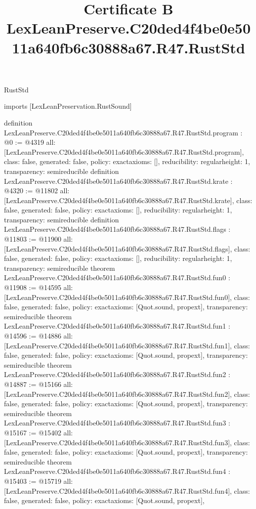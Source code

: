 \begin{lexlean}{RustStd}
\title{Certificate B LexLeanPreserve.C20ded4f4be0e5011a640fb6c30888a67.R47.RustStd}
\begin{coremodule}
imports [LexLeanPreservation.RustSound]

definition LexLeanPreserve.C20ded4f4be0e5011a640fb6c30888a67.R47.RustStd.program : @0 := @4319 {
  all: [LexLeanPreserve.C20ded4f4be0e5011a640fb6c30888a67.R47.RustStd.program],
  class: false,
  generated: false,
  policy: exact{axioms: []},
  reducibility: regular{height: 1},
  transparency: semireducible
}
definition LexLeanPreserve.C20ded4f4be0e5011a640fb6c30888a67.R47.RustStd.krate : @4320 := @11802 {
  all: [LexLeanPreserve.C20ded4f4be0e5011a640fb6c30888a67.R47.RustStd.krate],
  class: false,
  generated: false,
  policy: exact{axioms: []},
  reducibility: regular{height: 1},
  transparency: semireducible
}
definition LexLeanPreserve.C20ded4f4be0e5011a640fb6c30888a67.R47.RustStd.flags : @11803 := @11900 {
  all: [LexLeanPreserve.C20ded4f4be0e5011a640fb6c30888a67.R47.RustStd.flags],
  class: false,
  generated: false,
  policy: exact{axioms: []},
  reducibility: regular{height: 1},
  transparency: semireducible
}
theorem LexLeanPreserve.C20ded4f4be0e5011a640fb6c30888a67.R47.RustStd.fun0 : @11908 := @14595 {
  all: [LexLeanPreserve.C20ded4f4be0e5011a640fb6c30888a67.R47.RustStd.fun0],
  class: false,
  generated: false,
  policy: exact{axioms: [Quot.sound, propext]},
  transparency: semireducible
}
theorem LexLeanPreserve.C20ded4f4be0e5011a640fb6c30888a67.R47.RustStd.fun1 : @14596 := @14886 {
  all: [LexLeanPreserve.C20ded4f4be0e5011a640fb6c30888a67.R47.RustStd.fun1],
  class: false,
  generated: false,
  policy: exact{axioms: [Quot.sound, propext]},
  transparency: semireducible
}
theorem LexLeanPreserve.C20ded4f4be0e5011a640fb6c30888a67.R47.RustStd.fun2 : @14887 := @15166 {
  all: [LexLeanPreserve.C20ded4f4be0e5011a640fb6c30888a67.R47.RustStd.fun2],
  class: false,
  generated: false,
  policy: exact{axioms: [Quot.sound, propext]},
  transparency: semireducible
}
theorem LexLeanPreserve.C20ded4f4be0e5011a640fb6c30888a67.R47.RustStd.fun3 : @15167 := @15402 {
  all: [LexLeanPreserve.C20ded4f4be0e5011a640fb6c30888a67.R47.RustStd.fun3],
  class: false,
  generated: false,
  policy: exact{axioms: [Quot.sound, propext]},
  transparency: semireducible
}
theorem LexLeanPreserve.C20ded4f4be0e5011a640fb6c30888a67.R47.RustStd.fun4 : @15403 := @15719 {
  all: [LexLeanPreserve.C20ded4f4be0e5011a640fb6c30888a67.R47.RustStd.fun4],
  class: false,
  generated: false,
  policy: exact{axioms: [Quot.sound, propext]},
}
\end{coremodule}
\end{lexlean}
